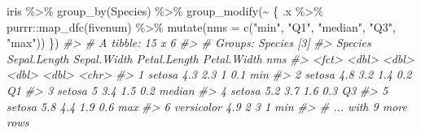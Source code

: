 \documentclass[
]{book}
\newenvironment{Shaded}{\begin{snugshade}}{\end{snugshade}}
\newcommand{\AttributeTok}[1]{\textcolor[rgb]{0.77,0.63,0.00}{#1}}
\newcommand{\CommentTok}[1]{\textcolor[rgb]{0.56,0.35,0.01}{\textit{#1}}}
\newcommand{\ConstantTok}[1]{\textcolor[rgb]{0.00,0.00,0.00}{#1}}
\newcommand{\FunctionTok}[1]{\textcolor[rgb]{0.00,0.00,0.00}{#1}}
\newcommand{\NormalTok}[1]{#1}
\newcommand{\OtherTok}[1]{\textcolor[rgb]{0.56,0.35,0.01}{#1}}
\newcommand{\SpecialCharTok}[1]{\textcolor[rgb]{0.00,0.00,0.00}{#1}}
\newcommand{\StringTok}[1]{\textcolor[rgb]{0.31,0.60,0.02}{#1}}
\begin{document}
\begin{Shaded}
\begin{Highlighting}[]
\NormalTok{iris }\SpecialCharTok{\%\textgreater{}\%}
  \FunctionTok{group\_by}\NormalTok{(Species) }\SpecialCharTok{\%\textgreater{}\%}
  \FunctionTok{group\_modify}\NormalTok{(}\SpecialCharTok{\textasciitilde{}}\NormalTok{ \{}
\NormalTok{    .x }\SpecialCharTok{\%\textgreater{}\%}
\NormalTok{      purrr}\SpecialCharTok{::}\FunctionTok{map\_dfc}\NormalTok{(fivenum) }\SpecialCharTok{\%\textgreater{}\%}
      \FunctionTok{mutate}\NormalTok{(}\AttributeTok{nms =} \FunctionTok{c}\NormalTok{(}\StringTok{"min"}\NormalTok{, }\StringTok{"Q1"}\NormalTok{, }\StringTok{"median"}\NormalTok{, }\StringTok{"Q3"}\NormalTok{, }\StringTok{"max"}\NormalTok{))}
\NormalTok{  \})}
\CommentTok{\#\textgreater{} \# A tibble: 15 x 6}
\CommentTok{\#\textgreater{} \# Groups:   Species [3]}
\CommentTok{\#\textgreater{}   Species    Sepal.Length Sepal.Width Petal.Length Petal.Width nms   }
\CommentTok{\#\textgreater{}   \textless{}fct\textgreater{}             \textless{}dbl\textgreater{}       \textless{}dbl\textgreater{}        \textless{}dbl\textgreater{}       \textless{}dbl\textgreater{} \textless{}chr\textgreater{} }
\CommentTok{\#\textgreater{} 1 setosa              4.3         2.3          1           0.1 min   }
\CommentTok{\#\textgreater{} 2 setosa              4.8         3.2          1.4         0.2 Q1    }
\CommentTok{\#\textgreater{} 3 setosa              5           3.4          1.5         0.2 median}
\CommentTok{\#\textgreater{} 4 setosa              5.2         3.7          1.6         0.3 Q3    }
\CommentTok{\#\textgreater{} 5 setosa              5.8         4.4          1.9         0.6 max   }
\CommentTok{\#\textgreater{} 6 versicolor          4.9         2            3           1   min   }
\CommentTok{\#\textgreater{} \# ... with 9 more rows}
\end{Highlighting}
\end{Shaded}

\begin{Shaded}
\end{Shaded}
\end{document}
